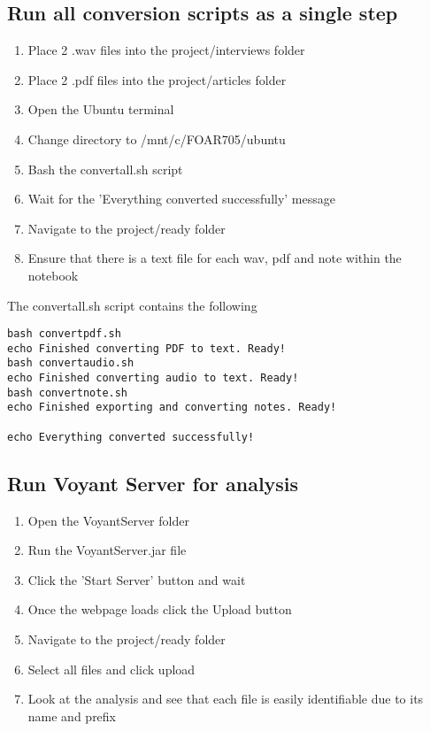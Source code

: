 \documentclass{article}
\begin{document}
\subsection{Run all conversion scripts as a single step}
\begin{enumerate}
    \item Place 2 .wav files into the project/interviews folder
    \item Place 2 .pdf files into the project/articles folder
    \item Open the Ubuntu terminal
    \item Change directory to /mnt/c/FOAR705/ubuntu
    \item Bash the convertall.sh script
    \item Wait for the 'Everything converted successfully' message
    \item Navigate to the project/ready folder
    \item Ensure that there is a text file for each wav, pdf and note within the notebook
\end{enumerate}
The convertall.sh script contains the following
\begin{verbatim}
bash convertpdf.sh
echo Finished converting PDF to text. Ready!
bash convertaudio.sh
echo Finished converting audio to text. Ready!
bash convertnote.sh
echo Finished exporting and converting notes. Ready!

echo Everything converted successfully!

\end{verbatim}

\subsection{Run Voyant Server for analysis}
\begin{enumerate}
    \item Open the VoyantServer folder
    \item Run the VoyantServer.jar file
    \item Click the 'Start Server' button and wait
    \item Once the webpage loads click the Upload button
    \item Navigate to the project/ready folder
    \item Select all files and click upload
    \item Look at the analysis and see that each file is easily identifiable due to its name and prefix 
\end{enumerate}
\end{document}
